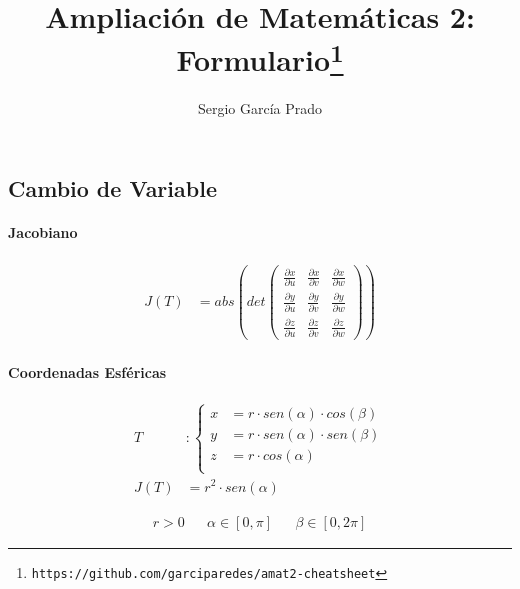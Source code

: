 \documentclass{article}
\title{\vspace{-2em}Ampliación de Matemáticas 2: Formulario\footnote{\texttt{https://github.com/garciparedes/amat2-cheatsheet}}}
\author{Sergio García Prado}
\date{}
\begin{document}

  \maketitle

  \begin{multicols}{2}


    \section{Cambio de Variable}

      \paragraph{Jacobiano}

      \begin{align*}
        J(T) &= abs\left(det\left(
          \begin{array}{ccc}
            \frac{\partial x}{\partial u} & \frac{\partial x}{\partial v} & \frac{\partial x}{\partial w} \\
            \frac{\partial y}{\partial u} & \frac{\partial y}{\partial v} & \frac{\partial y}{\partial w} \\
            \frac{\partial z}{\partial u} & \frac{\partial z}{\partial v} & \frac{\partial z}{\partial w}
          \end{array}
        \right)\right)
      \end{align*}

      \paragraph{Coordenadas Esféricas}

        \begin{align*}
          T &:
          \begin{cases}
            x &= r \cdot sen(\alpha) \cdot cos(\beta) \\
            y &= r \cdot sen(\alpha) \cdot sen(\beta) \\
            z &= r \cdot cos(\alpha) \\
          \end{cases} \\
          J(T) &= r ^ 2 \cdot sen(\alpha)
        \end{align*}

        \begin{align*}
          r > 0 && \alpha \in[0,\pi]&& \beta \in [0,2\pi]
        \end{align*}


\end{multicols}
\end{document}
